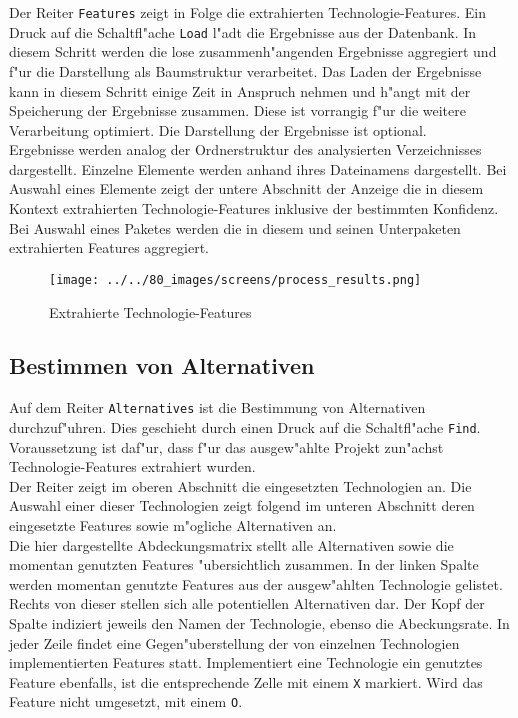\documentclass{proc}
\begin{document}
	Der Reiter \texttt{Features} zeigt in Folge die extrahierten Technologie-Features.
	Ein Druck auf die Schaltfl"ache \texttt{Load} l"adt die Ergebnisse aus der Datenbank.
	In diesem Schritt werden die lose zusammenh"angenden Ergebnisse aggregiert und f"ur die Darstellung als Baumstruktur verarbeitet.
	Das Laden der Ergebnisse kann in diesem Schritt einige Zeit in Anspruch nehmen und h"angt mit der Speicherung der Ergebnisse zusammen.
	Diese ist vorrangig f"ur die weitere Verarbeitung optimiert.
	Die Darstellung der Ergebnisse ist optional.
	\\
	Ergebnisse werden analog der Ordnerstruktur des analysierten Verzeichnisses dargestellt.
	Einzelne Elemente werden anhand ihres Dateinamens dargestellt.
	Bei Auswahl eines Elemente zeigt der untere Abschnitt der Anzeige die in diesem Kontext extrahierten Technologie-Features inklusive der bestimmten Konfidenz.
	Bei Auswahl eines Paketes werden die in diesem und seinen Unterpaketen extrahierten Features aggregiert.
	
	\begin{figure}[h!]
		\centering
		\caption{Extrahierte Technologie-Features}
		\texttt{[image: ../../80\_images/screens/process\_results.png]}
	\end{figure}
	
	\subsection{Bestimmen von Alternativen}
	
	Auf dem Reiter \texttt{Alternatives} ist die Bestimmung von Alternativen durchzuf"uhren.
	Dies geschieht durch einen Druck auf die Schaltfl"ache \texttt{Find}.
	Voraussetzung ist daf"ur, dass f"ur das ausgew"ahlte Projekt zun"achst Technologie-Features extrahiert wurden.
	\\
	Der Reiter zeigt im oberen Abschnitt die eingesetzten Technologien an.
	Die Auswahl einer dieser Technologien zeigt folgend im unteren Abschnitt deren eingesetzte Features sowie m"ogliche Alternativen an.
	\\
	Die hier dargestellte Abdeckungsmatrix stellt alle Alternativen sowie die momentan genutzten Features "ubersichtlich zusammen.
	In der linken Spalte werden momentan genutzte Features aus der ausgew"ahlten Technologie gelistet.
	Rechts von dieser stellen sich alle potentiellen Alternativen dar.
	Der Kopf der Spalte indiziert jeweils den Namen der Technologie, ebenso die Abeckungsrate.
	In jeder Zeile findet eine Gegen"uberstellung der von einzelnen Technologien implementierten Features statt.
	Implementiert eine Technologie ein genutztes Feature ebenfalls, ist die entsprechende Zelle mit einem \texttt{X} markiert.
	Wird das Feature nicht umgesetzt, mit einem \texttt{O}.
	
\end{document}
